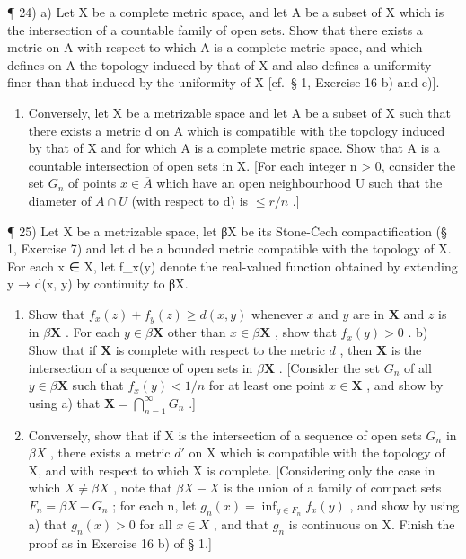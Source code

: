 ¶ 24) a) Let X be a complete metric space, and let A be a subset of X which is the intersection of a countable family of open sets. Show that there exists a metric on A with respect to which A is a complete metric space, and which defines on A the topology induced by that of X and also defines a uniformity finer than that induced by the uniformity of X {[}cf.~§ 1, Exercise 16 b) and c){]}.

\begin{enumerate}
\def\labelenumi{\alph{enumi})}
\setcounter{enumi}{1}
\tightlist
\item
  Conversely, let X be a metrizable space and let A be a subset of X such that there exists a metric d on A which is compatible with the topology induced by that of X and for which A is a complete metric space. Show that A is a countable intersection of open sets in X. {[}For each integer n \textgreater{} 0, consider the set \(G_{n}\) of points \(x \in \overline{A}\) which have an open neighbourhood U such that the diameter of \(A \cap U\) (with respect to d) is \(\leqslant r/n\) .{]}
\end{enumerate}

¶ 25) Let X be a metrizable space, let βX be its Stone-Čech compactification (§ 1, Exercise 7) and let d be a bounded metric compatible with the topology of X. For each x ∈ X, let f\_x(y) denote the real-valued function obtained by extending y → d(x, y) by continuity to βX.

\begin{enumerate}
\def\labelenumi{\alph{enumi})}
\item
  Show that \(f_{x}(z) + f_{y}(z) \geqslant d(x, y)\) whenever \(x\) and \(y\) are in \(\mathbf{X}\) and \(z\) is in \(\beta \mathbf{X}\) . For each \(y \in \beta \mathbf{X}\) other than \(x \in \beta \mathbf{X}\) , show that \(f_{x}(y) > 0\) . b) Show that if \(\mathbf{X}\) is complete with respect to the metric \(d\) , then \(\mathbf{X}\) is the intersection of a sequence of open sets in \(\beta \mathbf{X}\) . {[}Consider the set \(G_{n}\) of all \(y \in \beta \mathbf{X}\) such that \(f_{x}(y) < 1 / n\) for at least one point \(x \in \mathbf{X}\) , and show by using a) that \(\mathbf{X} = \bigcap_{n=1}^{\infty} G_{n}\) .{]}
\item
  Conversely, show that if X is the intersection of a sequence of open sets \(G_{n}\) in \(\beta X\) , there exists a metric \(d'\) on X which is compatible with the topology of X, and with respect to which X is complete. {[}Considering only the case in which \(X \neq \beta X\) , note that \(\beta X - X\) is the union of a family of compact sets \(F_{n} = \beta X - G_{n}\) ; for each n, let \(g_{n}(x) = \inf_{y \in F_{n}} f_{x}(y)\) , and show by using a) that \(g_{n}(x) > 0\) for all \(x \in X\) , and that \(g_{n}\) is continuous on X. Finish the proof as in Exercise 16 b) of § 1.{]}
\end{enumerate}

